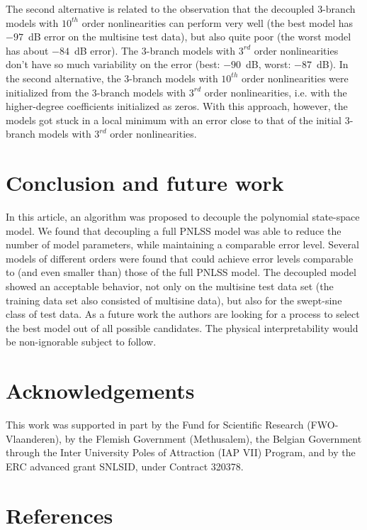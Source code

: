 \documentclass[review]{elsarticle}
\begin{document}
The second alternative is related to the observation that the decoupled 3-branch models with $10^{th}$ order nonlinearities can perform very well (the best model has $-97$~dB error on the multisine test data), but also quite poor (the worst model has about $-84$~dB error). The 3-branch models with $3^{rd}$ order nonlinearities don't have so much variability on the error (best: $-90$~dB, worst: $-87$~dB). In the second alternative, the 3-branch models with $10^{th}$ order nonlinearities were initialized from the 3-branch models with $3^{rd}$ order nonlinearities, i.e. with the higher-degree coefficients initialized as zeros. With this approach, however, the models got stuck in a local minimum with an error close to that of the initial 3-branch models with $3^{rd}$ order nonlinearities.

\section{Conclusion and future work}\label{Sec:Concl}
In this article, an algorithm was proposed to decouple the polynomial state-space model. 
We found that decoupling a full PNLSS model was able to reduce the number of model parameters, while maintaining a comparable error level.  
Several models of different orders were found that could achieve error levels comparable to (and even smaller than) those of the full PNLSS model. 
The decoupled model showed an acceptable behavior, not only on the multisine test data set (the training data set also consisted of multisine data), but also for the swept-sine class of test data.
As a future work the authors are looking for a process to select the best model out of all possible candidates. 
The physical interpretability would be non-ignorable subject to follow.
\section{Acknowledgements}
This work was supported in part by the Fund for Scientific
Research (FWO-Vlaanderen), by the Flemish Government (Methusalem), the Belgian Government through the Inter University Poles of Attraction (IAP VII) Program, and by the ERC advanced grant SNLSID, under Contract
320378.
\FloatBarrier

\section*{References}

\end{document}
